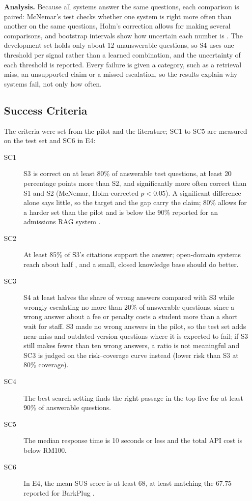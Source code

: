 \documentclass[12pt,nonacm,acmlarge,titlepage,screen]{acmart}
\begin{document}
\textbf{Analysis.} Because all systems answer the same questions, each comparison is paired: McNemar's test checks whether one system is right more often than another on the same questions, Holm's correction allows for making several comparisons, and bootstrap intervals show how uncertain each number is \cite{dror2018hitchhiker}. The development set holds only about 12 unanswerable questions, so S4 uses one threshold per signal rather than a learned combination, and the uncertainty of each threshold is reported. Every failure is given a category, such as a retrieval miss, an unsupported claim or a missed escalation, so the results explain why systems fail, not only how often.

\subsection{Success Criteria} \label{sec:method_success}

The criteria were set from the pilot and the literature; SC1 to SC5 are measured on the test set and SC6 in E4:
\begin{description}
  \item[SC1] S3 is correct on at least 80\% of answerable test questions, at least 20 percentage points more than S2, and significantly more often correct than S1 and S2 (McNemar, Holm-corrected $p < 0.05$). A significant difference alone says little, so the target and the gap carry the claim; 80\% allows for a harder set than the pilot and is below the 90\% reported for an admissions RAG system \cite{chen2024admission}.
  \item[SC2] At least 85\% of S3's citations support the answer; open-domain systems reach about half \cite{liu2023verifiability}, and a small, closed knowledge base should do better.
  \item[SC3] S4 at least halves the share of wrong answers compared with S3 while wrongly escalating no more than 20\% of answerable questions, since a wrong answer about a fee or penalty costs a student more than a short wait for staff. S3 made no wrong answers in the pilot, so the test set adds near-miss and outdated-version questions where it is expected to fail; if S3 still makes fewer than ten wrong answers, a ratio is not meaningful and SC3 is judged on the risk--coverage curve instead (lower risk than S3 at 80\% coverage).
  \item[SC4] The best search setting finds the right passage in the top five for at least 90\% of answerable questions.
  \item[SC5] The median response time is 10 seconds or less and the total API cost is below RM100.
  \item[SC6] In E4, the mean SUS score is at least 68, at least matching the 67.75 reported for BarkPlug \cite{neupane2024barkplug}.
\end{description}
\end{document}
